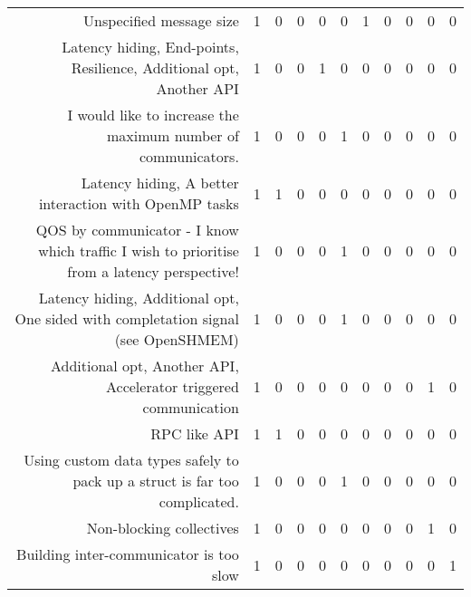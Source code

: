 {\begin{landscape}
\begin{longtable}[htb]{r|c|c|c|c|c|c|c|c|c|c}
{Unspecified message size} & 1 & 0 & 0 & 0 & 0 & 1 & 0 & 0 & 0 & 0 \\%
{Latency hiding, End-points, Resilience, Additional opt, Another API} & 1 & 0 & 0 & 1 & 0 & 0 & 0 & 0 & 0 & 0 \\%
{I would like to increase the maximum number of communicators.} & 1 & 0 & 0 & 0 & 1 & 0 & 0 & 0 & 0 & 0 \\%
{Latency hiding, A better interaction with OpenMP tasks} & 1 & 1 & 0 & 0 & 0 & 0 & 0 & 0 & 0 & 0 \\%
{QOS by communicator - I know which traffic I wish to prioritise from a latency perspective!} & 1 & 0 & 0 & 0 & 1 & 0 & 0 & 0 & 0 & 0 \\%
{Latency hiding, Additional opt, One sided with completation signal (see OpenSHMEM)} & 1 & 0 & 0 & 0 & 1 & 0 & 0 & 0 & 0 & 0 \\%
{Additional opt, Another API, Accelerator triggered communication} & 1 & 0 & 0 & 0 & 0 & 0 & 0 & 0 & 1 & 0 \\%
{RPC like API} & 1 & 1 & 0 & 0 & 0 & 0 & 0 & 0 & 0 & 0 \\%
{Using custom data types safely to pack up a struct is far too complicated.} & 1 & 0 & 0 & 0 & 1 & 0 & 0 & 0 & 0 & 0 \\%
{Non-blocking collectives} & 1 & 0 & 0 & 0 & 0 & 0 & 0 & 0 & 1 & 0 \\%
{Building inter-communicator is too slow} & 1 & 0 & 0 & 0 & 0 & 0 & 0 & 0 & 0 & 1 \\%
\hline%
\end{longtable}%
\end{landscape}}%
\clearpage%
